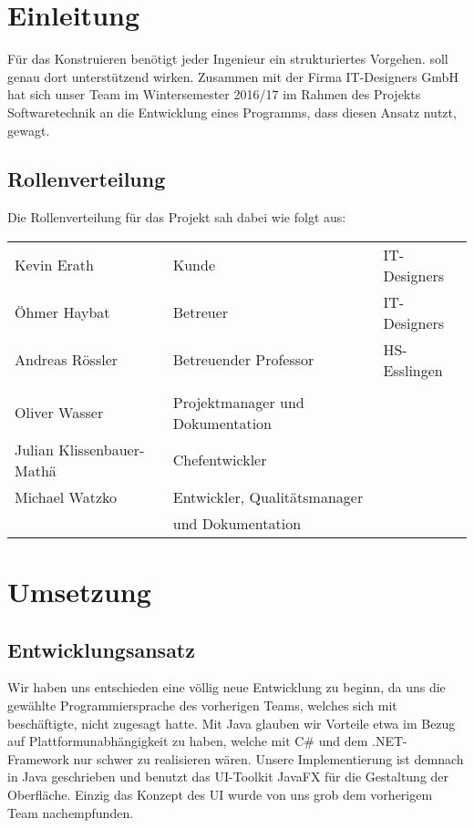 
\section{Einleitung}

Für das Konstruieren benötigt jeder Ingenieur ein strukturiertes Vorgehen. \textFlowDesign{}
soll genau dort unterstützend wirken.
Zusammen mit der Firma IT-Designers GmbH hat sich unser Team im Wintersemester 2016/17 im
Rahmen des Projekts Softwaretechnik an die Entwicklung eines Programms, dass diesen Ansatz
nutzt, gewagt.

\subsection{Rollenverteilung}
Die Rollenverteilung für das Projekt sah dabei wie folgt aus:

\begin{center}
	\begin{tabular}{l|l l}
		Kevin Erath & Kunde     & IT-Designers \\
		Öhmer Haybat & Betreuer & IT-Designers \\
		Andreas Rössler & Betreuender Professor & HS-Esslingen \\
		\\
		Oliver Wasser             & Projektmanager und Dokumentation & \\
		Julian Klissenbauer-Mathä & Chefentwickler & \\
		Michael Watzko            & Entwickler, Qualitätsmanager  \\
		                          & und Dokumentation \\
	\end{tabular}
\end{center}


\section{Umsetzung}

\subsection{Entwicklungsansatz}
Wir haben uns entschieden eine völlig neue Entwicklung zu beginn, da uns die gewählte
Programmiersprache des vorherigen Teams, welches sich mit \textFlowDesign{} beschäftigte,
nicht zugesagt hatte. Mit Java glauben wir Vorteile etwa im Bezug auf 
Plattformunabhängigkeit zu haben, welche mit C\# und dem .NET-Framework nur schwer zu
realisieren wären. \newline
Unsere Implementierung ist demnach in Java geschrieben und benutzt das UI-Toolkit JavaFX
für die Gestaltung der Oberfläche. \newline
Einzig das Konzept des UI wurde von uns grob dem vorherigem Team nachempfunden.

